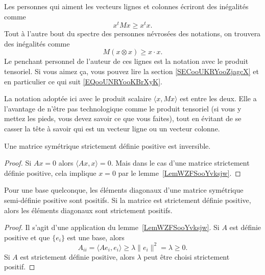 Les personnes qui aiment les vecteurs lignes et colonnes écriront des inégalités comme
\begin{equation}
    x^tMx\geq x^tx.
\end{equation}
Tout à l'autre bout du spectre des personnes névrosées des notations, on trouvera des inégalités comme
\begin{equation}
    M(x\otimes x)\geq x\cdot x.
\end{equation}
Le penchant personnel de l'auteur de ces lignes est la notation avec le produit tensoriel. Si vous aimez ça, vous pouvez lire la section \ref{SECooUKRYooZjagcX} et en particulier ce qui suit \eqref{EQooUNRYooKBrXyK}.

La notation adoptée ici avec le produit scalaire \( \langle x, Mx\rangle \) est entre les deux. Elle a l'avantage de n'être pas technologique comme le produit tensoriel (si vous y mettez les pieds, vous devez savoir ce que vous faites), tout en évitant de se casser la tête à savoir qui est un vecteur ligne ou un vecteur colonne.

\begin{corollary}
    Une matrice symétrique strictement définie positive est inversible.
\end{corollary}

\begin{proof}
    Si \( Ax=0\) alors \( \langle Ax, x\rangle =0\). Mais dans le cas d'une matrice strictement définie positive, cela implique \( x=0\) par le lemme~\ref{LemWZFSooYvksjw}.
\end{proof}

\begin{lemma}
    Pour une base quelconque, les éléments diagonaux d'une matrice symétrique semi-définie positive sont positifs. Si la matrice est strictement définie positive, alors les éléments diagonaux sont strictement positifs.
\end{lemma}

\begin{proof}
    Il s'agit d'une application du lemme~\ref{LemWZFSooYvksjw}. Si \( A\) est définie positive et que \( \{ e_i \}\) est une base, alors
    \begin{equation}
        A_{ii}=\langle Ae_i, e_i\rangle \geq \lambda\| e_i \|^2=\lambda\geq 0.
    \end{equation}
    Si \( A\) est strictement définie positive, alors \( \lambda\) peut être choisi strictement positif.
\end{proof}

